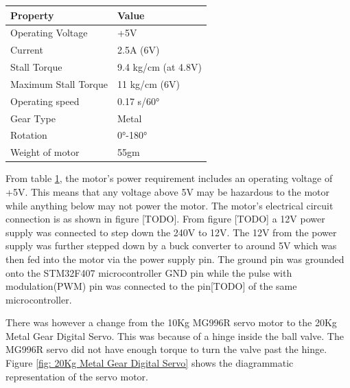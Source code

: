 \begin{itemize}
\begin{table}[H]
\begin{tabular}{|l|l|}
    \hline
    \textbf{Property} & \textbf{Value} \\ \hline
    Operating Voltage & +5V \\ \hline
    Current & 2.5A (6V) \\ \hline
    Stall Torque & 9.4 kg/cm (at 4.8V) \\ \hline
    Maximum Stall Torque & 11 kg/cm (6V) \\ \hline
    Operating speed & 0.17 s/60° \\ \hline
    Gear Type & Metal \\ \hline
    Rotation & 0°-180° \\ \hline
    Weight of motor & 55gm \\ \hline
    \end{tabular}
    \label{tab:MG996R_servo_specs}
    \end{table}
\par
From table \ref{tab:MG996R_servo_specs}, the motor's power requirement includes an operating voltage of +5V. This means that any voltage above 5V may be hazardous to the motor while anything below may not power the motor. The motor's electrical circuit connection is as shown in figure [TODO]. From figure [TODO] a 12V power supply was connected to step down the 240V to 12V. The 12V from the power supply was further stepped down by a buck converter to around 5V which was then fed into the motor via the power supply pin. The ground pin was grounded onto the STM32F407 microcontroller GND pin while the pulse with modulation(PWM) pin was connected to the pin[TODO] of the same microcontroller.
\par
There was however a change from the 10Kg MG996R servo motor to the 20Kg Metal Gear Digital Servo. This was because of a hinge inside the ball valve. The MG996R servo did not have enough torque to turn the valve past the hinge. Figure \ref{fig: 20Kg Metal Gear Digital Servo} shows the diagrammatic representation of the servo motor.
\begin{figure}[H]
        \centering

\end{figure}
\end{itemize}
